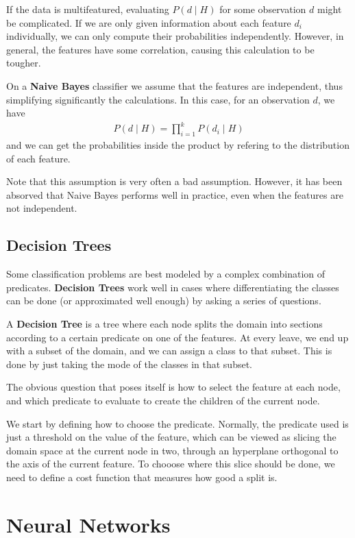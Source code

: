 \documentclass{article}
\begin{document}
If the data is multifeatured, evaluating $P(d \mid H)$ for some observation $d$ might be complicated.
If we are only given information about each feature $d_i$ individually, we can only compute their probabilities independently.
However, in general, the features have some correlation, causing this calculation to be tougher.

On a \textbf{Naive Bayes} classifier we assume that the features are independent, thus simplifying significantly the calculations.
In this case, for an observation $d$, we have
\begin{gather*}
P(d \mid H) = \prod_{i=1}^k P(d_i \mid H)
\end{gather*}
and we can get the probabilities inside the product by refering to the distribution of each feature.

Note that this assumption is very often a bad assumption.
However, it has been absorved that Naive Bayes performs well in practice, even when the features are not independent.

\subsection{Decision Trees}

Some classification problems are best modeled by a complex combination of predicates.
\textbf{Decision Trees} work well in cases where differentiating the classes can be done (or approximated well enough) by asking a series of questions.

A \textbf{Decision Tree} is a tree where each node splits the domain into sections according to a certain predicate on one of the features.
At every leave, we end up with a subset of the domain, and we can assign a class to that subset.
This is done by just taking the mode of the classes in that subset.

The obvious question that poses itself is how to select the feature at each node, and which predicate to evaluate to create the children of the current node.

We start by defining how to choose the predicate.
Normally, the predicate used is just a threshold on the value of the feature, which can be viewed as slicing the domain space at the current node in two, through an hyperplane orthogonal to the axis of the current feature.
To chooose where this slice should be done, we need to define a cost function that measures how good a split is.

\section{Neural Networks}
\end{document}
